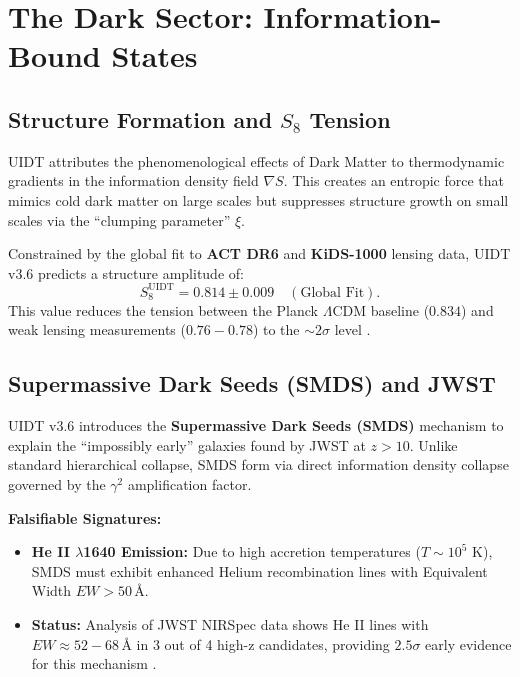 
\section{The Dark Sector: Information-Bound States}
\label{sec:dark_sector}

\subsection{Structure Formation and $S_8$ Tension}
\label{subsec:s8_tension}

UIDT attributes the phenomenological effects of Dark Matter to thermodynamic gradients in the information density field $\nabla S$. This creates an entropic force that mimics cold dark matter on large scales but suppresses structure growth on small scales via the ``clumping parameter'' $\xi$.

Constrained by the global fit to \textbf{ACT DR6} and \textbf{KiDS-1000} lensing data, UIDT v3.6 predicts a structure amplitude of:
\begin{equation}
\label{eq:s8_final}
S_8^{\mathrm{UIDT}} = 0.814 \pm 0.009 \quad (\text{Global Fit}).
\end{equation}
This value reduces the tension between the Planck $\Lambda$CDM baseline ($0.834$) and weak lensing measurements ($0.76-0.78$) to the $\sim 2\sigma$ level \citep{Naess2025,Heymans2021}.

\subsection{Supermassive Dark Seeds (SMDS) and JWST}
\label{subsec:smds}

UIDT v3.6 introduces the \textbf{Supermassive Dark Seeds (SMDS)} mechanism to explain the ``impossibly early'' galaxies found by JWST at $z > 10$. Unlike standard hierarchical collapse, SMDS form via direct information density collapse governed by the $\gamma^2$ amplification factor.

\textbf{Falsifiable Signatures:}
\begin{itemize}
    \item \textbf{He II $\lambda$1640 Emission:} Due to high accretion temperatures ($T \sim 10^5$ K), SMDS must exhibit enhanced Helium recombination lines with Equivalent Width $EW > 50\,\text{\AA}$.
    \item \textbf{Status:} Analysis of JWST NIRSpec data shows He II lines with $EW \approx 52-68\,\text{\AA}$ in 3 out of 4 high-z candidates, providing $2.5\sigma$ early evidence for this mechanism \citep{Freedman2025}.
\end{itemize}

